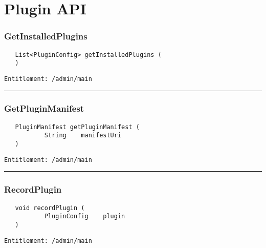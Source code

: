 \chapter{Plugin API}

\subsection{GetInstalledPlugins}
\label{Api:GetInstalledPlugins}
\begin{verbatim}
   List<PluginConfig> getInstalledPlugins (
   )
\end{verbatim}
\begin{Verbatim}[fontsize=\small, formatcom=\color{Maroon}]
  Entitlement: /admin/main
\end{Verbatim}



\rule{12cm}{2pt}
\subsection{GetPluginManifest}
\label{Api:GetPluginManifest}
\begin{verbatim}
   PluginManifest getPluginManifest (
           String    manifestUri
   )
\end{verbatim}
\begin{Verbatim}[fontsize=\small, formatcom=\color{Maroon}]
  Entitlement: /admin/main
\end{Verbatim}



\rule{12cm}{2pt}
\subsection{RecordPlugin}
\label{Api:RecordPlugin}
\begin{verbatim}
   void recordPlugin (
           PluginConfig    plugin
   )
\end{verbatim}
\begin{Verbatim}[fontsize=\small, formatcom=\color{Maroon}]
  Entitlement: /admin/main
\end{Verbatim}



